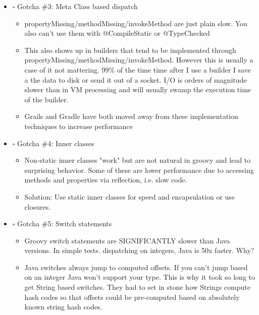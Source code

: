 \documentclass[11pt]{article}
\begin{document}
\begin{itemize}
\item $\square$ Gotcha \#3: Meta Class based dispatch

\begin{itemize}
\item propertyMissing/methodMissing/invokeMethod are just plain slow. You also can't use them with @CompileStatic or @TypeChecked

\item This also shows up in builders that tend to be implemented through propertyMissing/methodMissing/invokeMethod. However this is usually a case of it not mattering. 99\% of the time time after I use a builder I save a the data to disk or send it out of a socket. I/O is orders of magnitude slower than in VM processing and will usually swamp the execution time of the builder.

\item Grails and Gradle have both moved away from these implementation techniques to increase performance
\end{itemize}

\item $\square$ Gotcha \#4: Inner classes

\begin{itemize}
\item Non-static inner classes "work" but are not natural in groovy and lead to surprising behavior. Some of these are lower performance due to accessing methods and properties via reflection, i.e. slow code.

\item Solution: Use static inner classes for speed and encapsulation or use closures.
\end{itemize}

\item $\square$ Gotcha \#5: Switch statements

\begin{itemize}
\item Groovy switch statements are SIGNIFICANTLY slower than Java versions. In simple tests. dispatching on integers, Java is 50x faster. Why?

\item Java switches always jump to computed offsets. If you can't jump based on an integer Java won't support your type. This is why it took so long to get String based switches. They had to set in stone how Strings compute hash codes so that offsets could be pre-computed based on absolutely known string hash codes.


\end{itemize}
\end{itemize}
\end{document}
